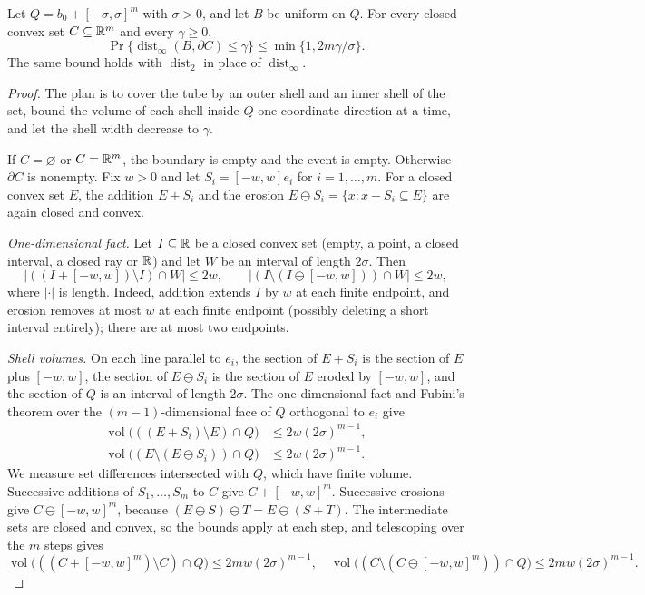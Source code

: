 \begin{lemma}\label{lem:cubetube}
Let $Q=b_0+[-\sigma,\sigma]^m$ with $\sigma>0$, and let $B$ be uniform on
$Q$. For every closed convex set $C\subseteq\mathbb R^m$ and every $\gamma\ge0$,
\begin{equation}\label{eq:cubetube}
 \Pr\{\operatorname{dist}_\infty(B,\partial C)\le\gamma\}
       \le\min\{1,2m\gamma/\sigma\}.
\end{equation}
The same bound holds with $\operatorname{dist}_2$ in place of
$\operatorname{dist}_\infty$.
\end{lemma}
\begin{proof}
The plan is to cover the tube by an outer shell and an inner shell of the
set, bound the volume of each shell inside $Q$ one coordinate direction
at a time, and let the shell width decrease to $\gamma$.

If $C=\varnothing$ or $C=\mathbb R^m$, the boundary is empty and the event is
empty. Otherwise $\partial C$ is nonempty. Fix $w>0$ and let
$S_i=[-w,w]e_i$ for $i=1,\ldots,m$. For a closed convex set $E$, the
addition $E+S_i$ and the erosion $E\ominus S_i=\{x:x+S_i\subseteq E\}$
are again closed and convex.

\emph{One-dimensional fact.} Let $I\subseteq\mathbb R$ be a closed convex set
(empty, a point, a closed interval, a closed ray or $\mathbb R$) and let $W$ be
an interval of length $2\sigma$. Then
\[
 \bigl|((I+[-w,w])\setminus I)\cap W\bigr|\le2w,\qquad
 \bigl|(I\setminus(I\ominus[-w,w]))\cap W\bigr|\le2w,
\]
where $|\cdot|$ is length. Indeed, addition extends $I$ by $w$ at each
finite endpoint, and erosion removes at most $w$ at each finite endpoint
(possibly deleting a short interval entirely); there are at most two
endpoints.

\emph{Shell volumes.} On each line parallel to $e_i$, the section of
$E+S_i$ is the section of $E$ plus $[-w,w]$, the section of $E\ominus S_i$
is the section of $E$ eroded by $[-w,w]$, and the section of $Q$ is an
interval of length $2\sigma$. The one-dimensional fact and Fubini's
theorem over the $(m-1)$-dimensional face of $Q$ orthogonal to $e_i$ give
\begin{align*}
 \operatorname{vol}\bigl(((E+S_i)\setminus E)\cap Q\bigr)
   &\le2w(2\sigma)^{m-1},\\
 \operatorname{vol}\bigl((E\setminus(E\ominus S_i))\cap Q\bigr)
   &\le2w(2\sigma)^{m-1}.
\end{align*}
We measure set differences intersected with $Q$, which have finite volume.
Successive additions of $S_1,\ldots,S_m$ to $C$ give $C+[-w,w]^m$.
Successive erosions give $C\ominus[-w,w]^m$, because
$(E\ominus S)\ominus T=E\ominus(S+T)$. The intermediate sets are closed
and convex, so the bounds apply at each step, and telescoping over the
$m$ steps gives
\[
 \operatorname{vol}\bigl(((C+[-w,w]^m)\setminus C)\cap Q\bigr)\le2mw(2\sigma)^{m-1},
 \quad
 \operatorname{vol}\bigl((C\setminus(C\ominus[-w,w]^m))\cap Q\bigr)\le2mw(2\sigma)^{m-1}.
\]


\end{proof}

